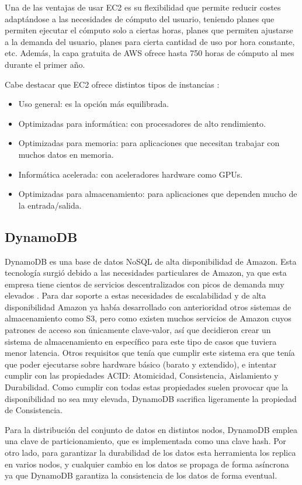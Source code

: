 Una de las ventajas de usar EC2 es su flexibilidad que permite reducir costes adaptándose a las necesidades de cómputo del usuario, teniendo planes que permiten ejecutar el cómputo solo a ciertas horas, planes que permiten ajustarse a la demanda del usuario, planes para cierta cantidad de uso por hora constante, etc. Además, la capa gratuita de AWS ofrece hasta 750 horas de cómputo al mes durante el primer año.

Cabe destacar que EC2 ofrece distintos tipos de instancias \cite{ec2_instances}:
\begin{itemize}
    \item Uso general: es la opción más equilibrada.
    \item Optimizadas para informática: con procesadores de alto rendimiento.
    \item Optimizadas para memoria: para aplicaciones que necesitan trabajar con muchos datos en memoria.
    \item Informática acelerada: con aceleradores hardware como GPUs.
    \item Optimizadas para almacenamiento: para aplicaciones que dependen mucho de la entrada/salida.
\end{itemize}

\subsection{DynamoDB}

DynamoDB es una base de datos NoSQL de alta disponibilidad de Amazon. Esta tecnología surgió debido a las necesidades particulares de Amazon, ya que esta empresa tiene cientos de servicios descentralizados con picos de demanda muy elevados \cite{amazon_dynamodb}. Para dar soporte a estas necesidades de escalabilidad y de alta disponibilidad Amazon ya había desarrollado con anterioridad otros sistemas de almacenamiento como S3, pero como existen muchos servicios de Amazon cuyos patrones de acceso son únicamente clave-valor, así que decidieron crear un sistema de almacenamiento en específico para este tipo de casos que tuviera menor latencia. Otros requisitos que tenía que cumplir este sistema era que tenía que poder ejecutarse sobre hardware básico (barato y extendido), e intentar cumplir con las propiedades ACID: Atomicidad, Consistencia, Aislamiento y Durabilidad. Como cumplir con todas estas propiedades suelen provocar que la disponibilidad no sea muy elevada, DynamoDB sacrifica ligeramente la propiedad de Consistencia.

Para la distribución del conjunto de datos en distintos nodos, DynamoDB emplea una clave de particionamiento, que es implementada como una clave hash. Por otro lado, para garantizar la durabilidad de los datos esta herramienta los replica en varios nodos, y cualquier cambio en los datos se propaga de forma asíncrona ya que DynamoDB garantiza la consistencia de los datos de forma eventual.

